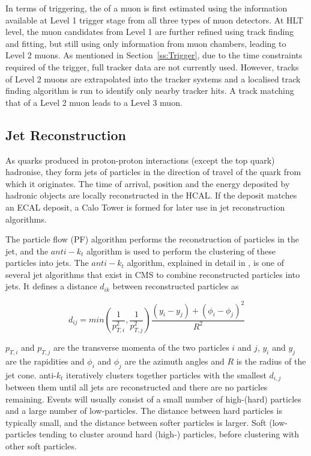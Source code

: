 In terms of triggering, the \pt of a muon is first estimated using the information available at Level 1
trigger stage from all three types of muon detectors. At HLT level, the muon candidates from Level 1 are
further refined using track finding and fitting, but still using only information from muon chambers, leading
to Level 2 muons. As mentioned in Section~\ref{ss:Trigger}, due to the time constraints required of the
trigger, full tracker data are not currently used. However, tracks of Level 2 muons are extrapolated into the
tracker systems and a localised track finding algorithm is run to identify only nearby tracker hits. A
track matching that of a Level 2 muon leads to a Level 3 muon. %

\subsection{Jet Reconstruction}
\label{ss:jet_reconstruction}
As quarks produced in proton-proton interactions (except the top quark) hadronise, they form jets of particles
in the direction of travel of the quark from which it originates. The time of arrival, position and the energy
deposited by hadronic objects are locally reconstructed in the HCAL. If the deposit matches an ECAL deposit, a
Calo Tower is formed for later use in jet reconstruction algorithms.

The particle flow (PF) algorithm performs the reconstruction of particles in the jet, and the $anti-k_{t}$
algorithm is used to perform the clustering of these particles into jets. The $anti-k_{t}$ algorithm,
explained in detail in \cite{Cacciari:2008gp}, is one of several jet algorithms that exist in CMS to
combine reconstructed particles into jets. It defines a distance $d_{ik}$ between reconstructed particles as

\begin{equation}
d_{ij} = min(\frac{1}{p_{T,i}^{2}},\frac{1}{p_{T,j}^{2}})\frac{(y_{i}-y_{j})+(\phi_{i}-\phi_{j})^{2}}{R^{2}}
\end{equation}

$p_{T,i}$ and $p_{T,j}$ are the transverse momenta of the two particles $i$ and $j$, $y_{i}$ and $y_{j}$ are
the rapidities and $\phi_{i}$ and $\phi_{j}$ are the azimuth angles and $R$ is the radius of the jet cone.
anti-$k_{t}$ iteratively clusters together particles with the smallest $d_{i,j}$ between them until all jets
are reconstructed and there are no particles remaining. Events will usually consist of a small number of
high-\pt (hard) particles and a large number of low-\pt particles. The distance between hard particles
is typically small, and the distance between softer particles is larger. Soft (low-\pt particles tending to
cluster around hard (high-\pt) particles, before clustering with other soft particles.

